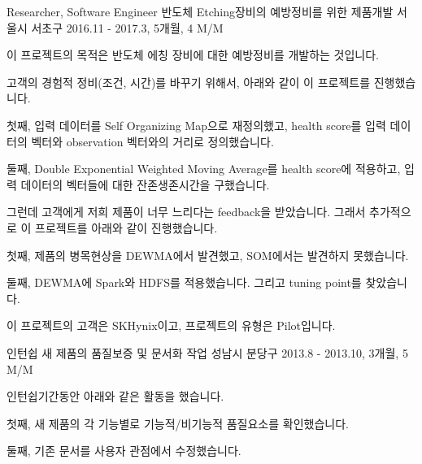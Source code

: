 \begin{cventries}
  \cventry
    {Researcher, Software Engineer} %
    {반도체 Etching장비의 예방정비를 위한 제품개발} %
    {서울시 서초구} %
    {2016.11 - 2017.3, 5개월, 4 M/M} %
    {
      \begin{cvitems} %
        \item {이 프로젝트의 목적은 반도체 에칭 장비에 대한 예방정비를 개발하는 것입니다.}
        \item {고객의 경험적 정비(조건, 시간)를 바꾸기 위해서, 아래와 같이 이 프로젝트를 진행했습니다.}
        \item {첫째, 입력 데이터를 Self Organizing Map으로 재정의했고, health score를 입력 데이터의 벡터와 observation 벡터와의 거리로 정의했습니다.}
        \item {둘째, Double Exponential Weighted Moving Average를 health score에 적용하고, 입력 데이터의 벡터들에 대한 잔존생존시간을 구했습니다.}
        \item {그런데 고객에게 저희 제품이 너무 느리다는 feedback을 받았습니다. 그래서 추가적으로 이 프로젝트를 아래와 같이 진행했습니다.}
        \item {첫째, 제품의 병목현상을 DEWMA에서 발견했고, SOM에서는 발견하지 못했습니다.}
        \item {둘째, DEWMA에 Spark와 HDFS를 적용했습니다. 그리고 tuning point를 찾았습니다.}
        \item {이 프로젝트의 고객은 SKHynix이고, 프로젝트의 유형은 Pilot입니다.}
      \end{cvitems}
    }

  \cventry
    {인턴쉽} %
    {새 제품의 품질보증 및 문서화 작업} %
    {성남시 분당구} %
    {2013.8 - 2013.10, 3개월, 5 M/M} %
    {
      \begin{cvitems} %
        \item {인턴쉽기간동안 아래와 같은 활동을 했습니다.}
        \item {첫째, 새 제품의 각 기능별로 기능적/비기능적 품질요소를 확인했습니다.}
        \item {둘째, 기존 문서를 사용자 관점에서 수정했습니다.}
      \end{cvitems}
    }

\end{cventries}
